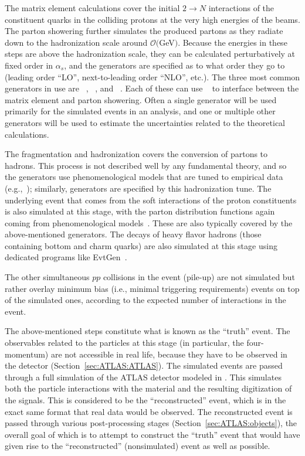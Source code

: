 The matrix element calculations cover the initial $2\rightarrow N$ interactions of the constituent quarks in the colliding protons at the very high energies of the beams.
The parton showering further simulates the produced partons as they radiate down to the hadronization scale around $\mathcal{O}($GeV$)$.
Because the energies in these steps are above the hadronization scale, they can be calculated perturbatively at fixed order in $\alpha_s$, and the generators are specified as to what order they go to (leading order ``LO'', next-to-leading order ``NLO'', etc.).
The three most common generators in use are \PYTHIA~\cite{Sjostrand:2007gs,Sjostrand:2014zea}, \SHERPA~\cite{Gleisberg:2008ta}, and \HERWIG~\cite{Bahr:2008pv,Bellm:2015jjp}.
Each of these can use \POWHEGBOX~\cite{Frixione:2007vw,Alioli:2010xd} to interface between the matrix element and parton showering.
Often a single generator will be used primarily for the simulated events in an analysis, and one or multiple other generators will be used to estimate the uncertainties related to the theoretical calculations.

The fragmentation and hadronization covers the conversion of partons to hadrons.
This process is not described well by any fundamental theory, and so the generators use phenomenological models that are tuned to empirical data (e.g.,~\cite{ATL-PHYS-PUB-2014-021}); similarly, generators are specified by this hadronization tune.
The underlying event that comes from the soft interactions of the proton constituents is also simulated at this stage, with the parton distribution functions again coming from phenomenological models~\cite{Lai:2010vv}.
These are also typically covered by the above-mentioned generators.
The decays of heavy flavor hadrons (those containing bottom and charm quarks) are also simulated at this stage using dedicated programs like EvtGen~\cite{Lange:2001uf}.

The other simultaneous $pp$ collisions in the event (pile-up) are not simulated but rather overlay minimum bias (i.e., minimal triggering requirements) events on top of the simulated ones, according to the expected number of interactions in the event.

The above-mentioned steps constitute what is known as the ``truth'' event.
The observables related to the particles at this stage (in particular, the four-momentum) are not accessible in real life, because they have to be observed in the detector (Section~\ref{sec:ATLAS:ATLAS}).
The simulated events are passed through a full simulation of the ATLAS detector modeled in \GEANT\cite{Agostinelli:2002hh}.
This simulates both the particle interactions with the material and the resulting digitization of the signals.
This is considered to be the ``reconstructed'' event, which is in the exact same format that real data would be observed.
The reconstructed event is passed through various post-processing stages (Section~\ref{sec:ATLAS:objects}), the overall goal of which is to attempt to construct the ``truth'' event that would have given rise to the ``reconstructed'' (nonsimulated) event as well as possible.

